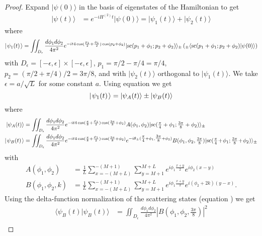 \documentclass[../thesis-main/thesis-main]{subfiles}
\begin{document}
\begin{proof}
Expand $|\psi(0)\rangle$ in the basis of eigenstates of the Hamiltonian
to get
\begin{align*}
|\psi(t)\rangle & = e^{-iH^{(2)}t}|\psi(0)\rangle = |\psi_{1}(t)\rangle+|\psi_{2}(t)\rangle
\end{align*}
where 
\[
  |\mspace{2mu} \psi_{1}(t) \mspace{2mu} \rangle = \iint_{D_{\epsilon}} \frac{d\phi_{1}d\phi_{2}} 
    {4\pi^{2}} e^{-it 4\cos(\frac{p_{1}}{2}+\frac{\phi_{1}}{2})
      \cos(p_{2} + \phi_{2})}|\text{sc}(p_{1}+\phi_{1};p_{2}+ 
    \phi_{2})\rangle_{\pm} \left({_{\pm}\langle\text{sc}(p_{1}+\phi_{1};p_{2}+\phi_{2})|\psi(0)\rangle}\right)
\]
with $D_{\epsilon}=\left[-\epsilon,\epsilon\right]\times\left[-\epsilon,\epsilon\right]$, $p_{1}= {\pi}/{2}-{\pi}/{4}=
{\pi}/{4}$, $p_{2}=({\pi}/{2} +
{\pi}/{4})/2={3\pi}/{8}$,
and with $|\psi_{2}(t)\rangle$ orthogonal to $|\psi_{1}(t)\rangle$.
We take $\epsilon=a/\sqrt{L}$ for some constant $a$. Using equation 
we get 
\[
  |\mspace{2mu} \psi_{1}(t) \mspace{2mu} \rangle=|\psi_{A}(t)\rangle\pm|\psi_{B}(t)\rangle
\]
where
\begin{align}
  |\psi_{A}(t)\rangle & = \iint_{D_{\epsilon}} \frac{d\phi_{1}d\phi_{2}}
    {4\pi^{2}} e^{-it 4\cos(\frac{\pi}{8}+\frac{\phi_{1}}{2})
    \cos(\frac{3\pi}{8}+\phi_{2})}
     A(\phi_{1},\phi_{2})|\text{sc}(\tfrac{\pi}{4}+\phi_{1};
     \tfrac{3\pi}{8}+\phi_{2})\rangle_{\pm} \label{eq:psiA} \\
 |\mspace{2mu} \psi_{B}(t) \mspace{2mu} \rangle & = \iint_{D_{\epsilon}} \frac{d\phi_{1}d\phi_{2}}
    {4\pi^{2}} e^{-it 4\cos(\frac{\pi}{8}+\frac{\phi_{1}}{2})
    \cos(\frac{3\pi}{8}+\phi_{2})}  e^{-i\theta_{\pm}(\tfrac{\pi}{4}+\phi_{1},\tfrac{3\pi}{8}+\phi_{2} )}B(\phi_{1},\phi_{2},\tfrac{3\pi}{8})
 	|\text{sc}(\tfrac{\pi}{4}\! +\!\phi_{1};\tfrac{3\pi}{8}\! +\!\phi_{2})\rangle_\pm \nonumber 
\end{align}
with
\begin{align}
A(\phi_{1},\phi_{2}) & = \frac{1}{L}\sum_{x=-(M+L)}^{-(M+1)}\sum_{y=M+1}^{M+L} 
    e^{i\phi_{1}\frac{x+y}{2}}e^{i\phi_{2}\left(x-y\right)}\label{eq:A}\\
B(\phi_{1},\phi_{2},k) & = \frac{1}{L}\sum_{x=-(M+L)}^{-(M+1)}
    \sum_{y=M+1}^{M+L}e^{i\phi_{1}\frac{x+y}{2}} 	
    e^{i\left(\phi_{2}+2 k\right)\left(y-x\right)}.\nonumber 
\end{align}
 Using the delta-function normalization of the scattering states (equation
) we get 
\begin{align*}
\langle\psi_{B}(t)|\psi_{B}(t)\rangle & = \iint_{D_{\epsilon}}\frac{d\phi_{1}d\phi_{2}}{4\pi^{2}}\left|B(\phi_{1},\phi_{2},\tfrac{3\pi}{8})\right|^{2}\\

\end{align*}
\end{proof}
\end{document}
